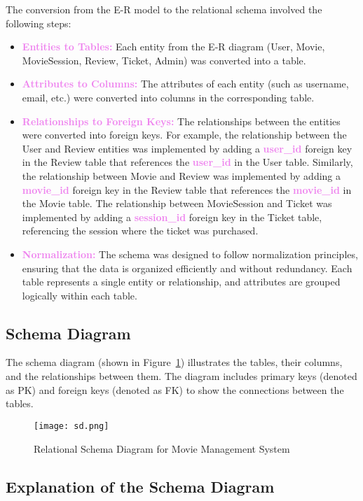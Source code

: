 \documentclass[a4paper,12pt]{article}  %
\renewcommand{\textbf}[1]{\textcolor{violet}{\bfseries #1}}
\begin{document}
The conversion from the E-R model to the relational schema involved the following steps:

\begin{itemize}
    \item \textbf{Entities to Tables:} Each entity from the E-R diagram (User, Movie, MovieSession, Review, Ticket, Admin) was converted into a table.
    \item \textbf{Attributes to Columns:} The attributes of each entity (such as username, email, etc.) were converted into columns in the corresponding table.
    \item \textbf{Relationships to Foreign Keys:} The relationships between the entities were converted into foreign keys. For example, the relationship between the User and Review entities was implemented by adding a \textbf{user\_id} foreign key in the Review table that references the \textbf{user\_id} in the User table. Similarly, the relationship between Movie and Review was implemented by adding a \textbf{movie\_id} foreign key in the Review table that references the \textbf{movie\_id} in the Movie table. The relationship between MovieSession and Ticket was implemented by adding a \textbf{session\_id} foreign key in the Ticket table, referencing the session where the ticket was purchased.
    \item \textbf{Normalization:} The schema was designed to follow normalization principles, ensuring that the data is organized efficiently and without redundancy. Each table represents a single entity or relationship, and attributes are grouped logically within each table.
\end{itemize}
\newpage

\subsection{Schema Diagram}

The schema diagram (shown in Figure~\ref{fig:SD}) illustrates the tables, their columns, and the relationships between them. The diagram includes primary keys (denoted as PK) and foreign keys (denoted as FK) to show the connections between the tables.

\begin{figure}[h]
\centering
\texttt{[image: sd.png]}
\caption{Relational Schema Diagram for Movie Management System}
\label{fig:SD}
\end{figure}
\newpage
\subsection{Explanation of the Schema Diagram}
\end{document}
